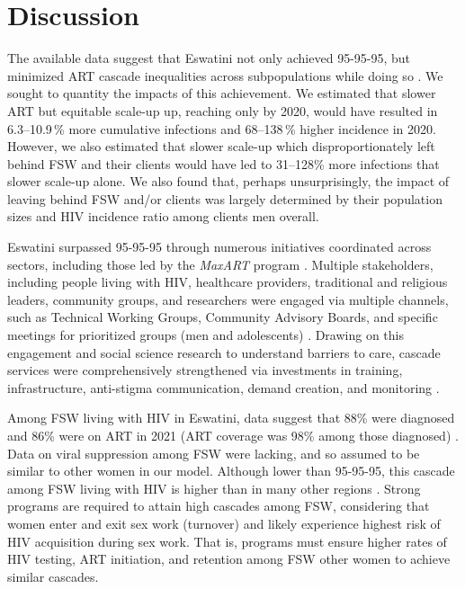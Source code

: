 \section{Discussion}\label{art.disc}
The available data suggest that Eswatini not only achieved 95-95-95,
but minimized ART cascade inequalities across subpopulations while doing so
\cite{SHIMS3,EswIBBS2022}.
We sought to quantity the impacts of this achievement.
We estimated that slower ART but equitable scale-up up,
reaching only \casmd by 2020, would have resulted in
6.3--10.9\,\% more cumulative infections and 68--138\,\% higher incidence in 2020. %
However, we also estimated that
slower scale-up which disproportionately left behind FSW and their clients
would have led to 31--128\% more infections that slower scale-up alone. %
We also found that, perhaps unsurprisingly,
the impact of leaving behind FSW and/or clients was largely determined by
their population sizes and HIV incidence ratio among clients \vs men overall. %
\par
Eswatini surpassed 95-95-95 through
numerous initiatives coordinated across sectors,
including those led by the \emph{MaxART} program \cite{MaxART1,MaxART2}.
Multiple stakeholders, including people living with HIV, healthcare providers,
traditional and religious leaders, community groups, and researchers
were engaged via multiple channels, such as
Technical Working Groups, Community Advisory Boards,
and specific meetings for prioritized groups (men and adolescents) \cite{MaxART1,MaxART2}.
Drawing on this engagement and
social science research to understand barriers to care,
cascade services were comprehensively strengthened via investments in
training, infrastructure, anti-stigma communication, demand creation, and monitoring
\cite{MaxART1,MaxART2}.
\par
Among FSW living with HIV in Eswatini, data suggest that
88\% were diagnosed and 86\% were on ART in 2021
(\ie ART coverage was 98\% among those diagnosed) \cite{EswIBBS2022}.
Data on viral suppression among FSW were lacking,
and so assumed to be similar to other women in our model.
Although lower than 95-95-95, this cascade among FSW living with HIV
is higher than in many other regions \cite{Schwartz2017,Hakim2018}.
Strong programs are required to attain high cascades among FSW,
considering that women enter and exit sex work (turnover) and
likely experience highest risk of HIV acquisition during sex work.
That is, programs must ensure higher rates of HIV testing, ART initiation, and retention
among FSW \vs other women to achieve similar cascades.
